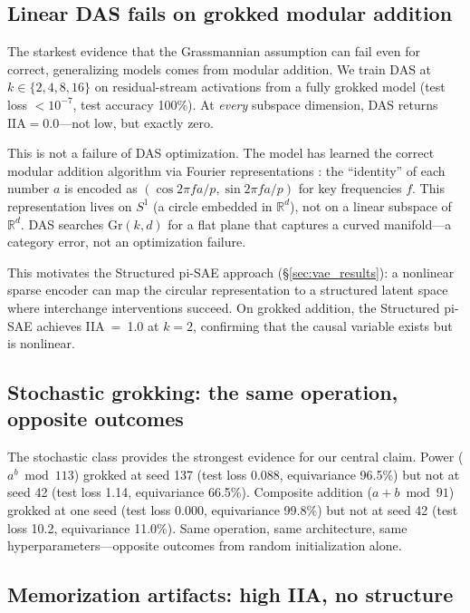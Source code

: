 \documentclass{article}
\newcommand{\Gr}{\mathrm{Gr}}
\newcommand{\IIA}{\mathrm{IIA}}
\newcommand{\R}{\mathbb{R}}
\begin{document}
\subsection{Linear DAS fails on grokked modular addition}
\label{sec:linear_das_fails}

The starkest evidence that the Grassmannian assumption can fail even for correct,
generalizing models comes from modular addition. We train DAS at
$k \in \{2, 4, 8, 16\}$ on residual-stream activations from a fully grokked
model (test loss $< 10^{-7}$, test accuracy 100\%). At \emph{every} subspace
dimension, DAS returns $\IIA = 0.0$---not low, but exactly zero.

This is not a failure of DAS optimization. The model has learned the correct
modular addition algorithm via Fourier representations \citep{nanda2023progress}:
the ``identity'' of each number $a$ is encoded as
$(\cos 2\pi f a / p, \sin 2\pi f a / p)$ for key frequencies $f$. This
representation lives on $S^1$ (a circle embedded in $\R^d$), not on a linear
subspace of $\R^d$. DAS searches $\Gr(k,d)$ for a flat plane that captures a
curved manifold---a category error, not an optimization failure.

This motivates the Structured pi-SAE approach (\S\ref{sec:vae_results}):
a nonlinear sparse encoder can map the circular representation to a structured
latent space where interchange interventions succeed. On grokked addition, the
Structured pi-SAE achieves IIA~=~1.0 at $k{=}2$, confirming that the causal
variable exists but is nonlinear.

\subsection{Stochastic grokking: the same operation, opposite outcomes}
\label{sec:stochastic}

The stochastic class provides the strongest evidence for our central claim.
Power ($a^b \bmod 113$) grokked at seed 137 (test loss 0.088, equivariance
96.5\%) but not at seed 42 (test loss 1.14, equivariance 66.5\%). Composite
addition ($a + b \bmod 91$) grokked at one seed (test loss 0.000, equivariance
99.8\%) but not at seed 42 (test loss 10.2, equivariance 11.0\%). Same
operation, same architecture, same hyperparameters---opposite outcomes from
random initialization alone.


\subsection{Memorization artifacts: high IIA, no structure}
\label{sec:memorization}
\end{document}
